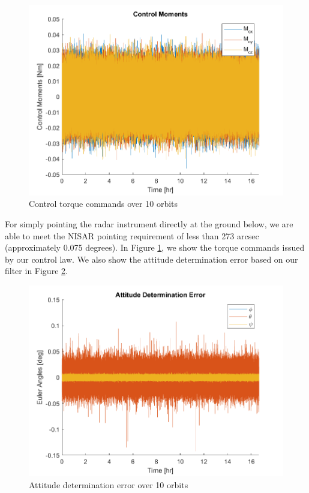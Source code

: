 \begin{figure}[H]
\centering
\includegraphics[scale=0.7]{Images/ps9_problem3_controlMoments_nonlinear.png}
\caption{Control torque commands over 10 orbits}
\label{fig:ps9_problem3_controlMoments_nonlinear}
\end{figure}

For simply pointing the radar instrument directly at the ground below, we are able to meet the NISAR pointing requirement of less than 273 arcsec (approximately 0.075 degrees). In Figure \ref{fig:ps9_problem3_controlMoments_nonlinear}, we show the torque commands issued by our control law. We also show the attitude determination error based on our filter in Figure \ref{fig:ps9_problem3_determinationError_nonlinear}.

\begin{figure}[H]
\centering
\includegraphics[scale=0.7]{Images/ps9_problem3_determinationError_nonlinear.png}
\caption{Attitude determination error over 10 orbits}
\label{fig:ps9_problem3_determinationError_nonlinear}
\end{figure}

